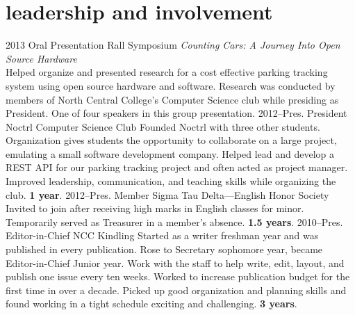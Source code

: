 \documentclass[]{friggeri-cv} %
\begin{document}

\section{leadership and involvement}

\begin{entrylist}
\entry
{2013}
{Oral Presentation}
{Rall Symposium}
{\emph{Counting Cars: A Journey Into Open Source Hardware}\\
Helped organize and presented research for a cost effective parking tracking system using open source hardware and software.
Research was conducted by members of North Central College's Computer Science club while presiding as President.
One of four speakers in this group presentation.}
\entry
{2012--Pres.}
{President}
{Noctrl Computer Science Club}
{Founded Noctrl with three other students.
Organization gives students the opportunity to collaborate on a large project, emulating a small software development company.
Helped lead and develop a REST API for our parking tracking project and often acted as project manager.
Improved leadership, communication, and teaching skills while organizing the club. \textbf{1 year}.}
\entry
{2012--Pres.}
{Member}
{Sigma Tau Delta---English Honor Society}
{Invited to join after receiving high marks in English classes for minor.
Temporarily served as Treasurer in a member's absence. \textbf{1.5 years}.}
\entry
{2010--Pres.}
{Editor-in-Chief}
{NCC Kindling}
{Started as a writer freshman year and was published in every publication.
Rose to Secretary sophomore year, became Editor-in-Chief Junior year.
Work with the staff to help write, edit, layout, and publish one issue every ten weeks.
Worked to increase publication budget for the first time in over a decade.
Picked up good organization and planning skills and found working in a tight schedule exciting and challenging. \textbf{3 years}.}
\end{entrylist}
\end{document}
